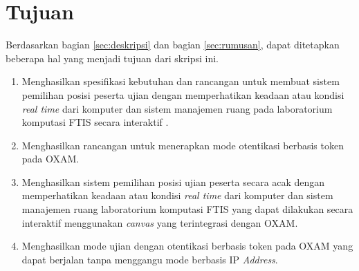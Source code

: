 \documentclass[a4paper,twoside]{article}
\begin{document}
\section{Tujuan}

Berdasarkan bagian \ref{sec:deskripsi} dan bagian \ref{sec:rumusan}, dapat ditetapkan beberapa hal yang menjadi tujuan dari skripsi ini.

\begin{enumerate}
    \item Menghasilkan spesifikasi kebutuhan dan rancangan untuk membuat sistem pemilihan posisi peserta ujian dengan memperhatikan keadaan atau kondisi \textit{real time} dari komputer dan sistem manajemen ruang pada laboratorium komputasi FTIS secara interaktif .
    \item Menghasilkan rancangan untuk menerapkan mode otentikasi berbasis token pada OXAM.
    \item Menghasilkan sistem pemilihan posisi ujian peserta secara acak dengan memperhatikan keadaan atau kondisi \textit{real time} dari komputer dan sistem manajemen ruang laboratorium komputasi FTIS yang dapat dilakukan secara interaktif menggunakan \textit{canvas} yang terintegrasi dengan OXAM.
    \item Menghasilkan mode ujian dengan otentikasi berbasis token pada OXAM yang dapat berjalan tanpa menggangu mode berbasis IP \textit{Address}.
\end{enumerate}
\end{document}
